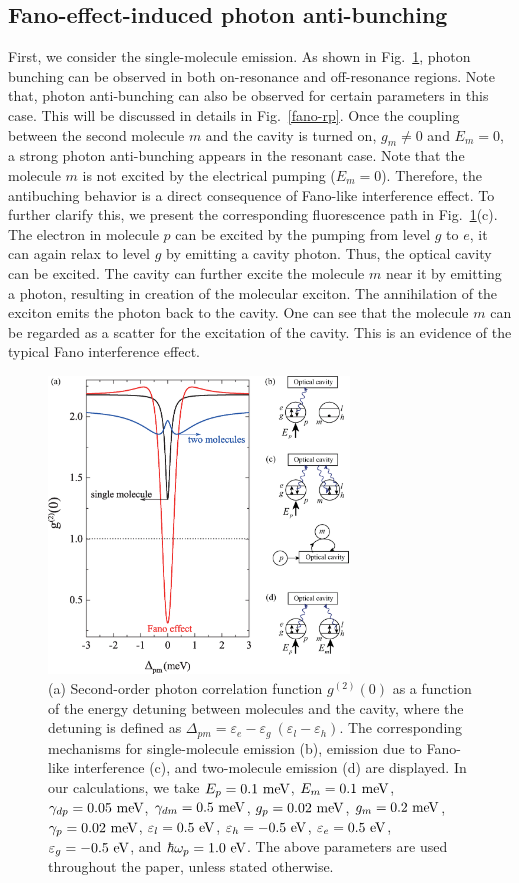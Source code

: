 \documentclass[aps,prb,
,floatfix,footinbib,longbibliography,
preprint
]{revtex4-2}
\begin{document}
\subsection{Fano-effect-induced photon anti-bunching}
 First, we consider the single-molecule emission.
As shown in Fig.~\ref{fano-compare}, photon bunching can be observed in both on-resonance and off-resonance regions. Note that, photon anti-bunching can also be observed for certain parameters in this case. This will be discussed in details in Fig.~\ref{fano-rp}.
Once the coupling between the second molecule $m$ and the cavity is turned on, $g_{m}\neq0$ and $E_{m}=0$, a strong photon anti-bunching appears in the resonant case.
Note that the molecule $m$ is not excited by the electrical pumping ($E_{m}=0$). Therefore, the antibuching behavior is a direct consequence of Fano-like interference effect.
To further clarify this, we present the corresponding fluorescence path in Fig.~\ref{fano-compare}(c). The electron in molecule $p$ can be excited by the pumping from level $g$ to $e$, it can again relax to level $g$ by emitting a cavity photon. Thus, the optical cavity can be excited. The cavity can further excite the molecule $m$ near it by emitting a photon, resulting in creation of the molecular exciton.
The annihilation of the exciton emits the photon back to the cavity. One can see that the molecule $m$ can be regarded as a scatter for the excitation of the cavity. This is an evidence of the typical Fano interference effect\cite{PhysRev.124.1866,RevModPhys.82.2257}.
%
\begin{figure}[h]
\centering
\includegraphics[width=8cm]{fano-compare.eps}
\caption{(a) Second-order photon correlation function $g^{(2)}(0)$ as a function of the energy detuning between molecules and the cavity, where the detuning is defined as $\Delta_{pm}=\varepsilon_{e}-\varepsilon_{g}~(\varepsilon_{l}-\varepsilon_{h})$.
The corresponding mechanisms for single-molecule emission (b), emission due to Fano-like interference (c), and two-molecule emission (d) are displayed. In our calculations,
we take $E_{p}=0.1~{\rm meV}$, $E_{m}=0.1~{\rm meV}$, $\gamma_{dp}=0.05~{\rm meV}$, $\gamma_{dm}=0.5~{\rm meV}$, $g_{p}=0.02~{\rm meV}$, $g_{m}=0.2~{\rm meV}$, $\gamma_{p}=0.02~{\rm meV}$, $\varepsilon_{l}=0.5~{\rm eV}$, $\varepsilon_{h}=-0.5~{\rm eV}$, $\varepsilon_{e}=0.5~{\rm eV}$, $\varepsilon_{g}=-0.5~{\rm eV}$, and $\hbar\omega_{p}=1.0~{\rm eV}$.
The above parameters are used throughout the paper, unless stated otherwise. }
\label{fano-compare}
\end{figure}
\end{document}

